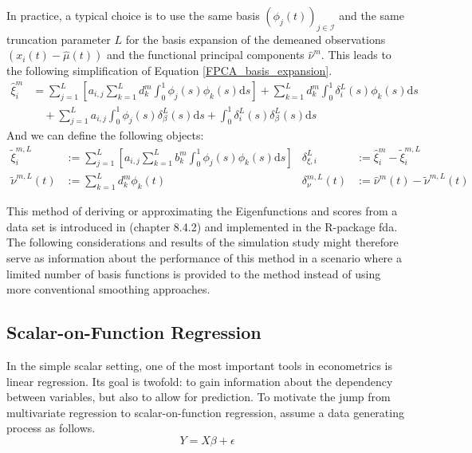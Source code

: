 \documentclass[11pt,twoside,a4paper]{article}
\begin{document}
	In practice, a typical choice is to use the same basis $\left(\phi_j(t)\right)_{j \in \mathcal{I}}$ and the same truncation parameter $L$ for the basis expansion of the demeaned observations $\left(x_i(t) - \hat{\mu}(t)\right)$ and the functional principal components $\hat{\nu}^m$. This leads to the following simplification of Equation \ref{FPCA_basis_expansion}.
	\begin{equation}\label{score_approx}
		\begin{split}
			\hat{\xi}_{i}^m &= \sum_{j = 1}^{L} \left[a_{i,j}\sum_{k = 1}^{L} d_{k}^m \int_{0}^{1} \phi_j(s) \phi_{k}(s)\mathrm{d}s \right] +  \sum_{k = 1}^{L} d_{k}^m \int_{0}^{1} \delta_i^L(s) \phi_{k}(s) \mathrm{d}s \\
			& \quad + \sum_{j = 1}^{L} a_{i,j} \int_{0}^{1}\phi_j(s) \delta_{\beta}^L(s) \mathrm{d}s + \int_{0}^{1} \delta_i^L(s) \delta_{\beta}^L(s) \mathrm{d}s
		\end{split}
	\end{equation}
	And we can define the following objects:
		\begin{align}
			\tilde{\xi}^{m,L}_{i} & := \sum_{j = 1}^{L} \left[a_{i,j}\sum_{k = 1}^{L} b_{k}^m \int_{0}^{1} \phi_j(s) \phi_{k}(s)\mathrm{d}s \right] 
			& \delta_{\xi, i}^L & := \hat{\xi}_{i}^m - \tilde{\xi}^{m,L}_{i} \\
			\tilde{\nu}^{m,L}(t) & := \sum_{k = 1}^{L} d_{k}^m \phi_{k}(t) 
			& \delta_{\nu}^{m, L}(t) & := \hat{\nu}^m(t) - \tilde{\nu}^{m,L}(t)
		\end{align}	
	
	This method of deriving or approximating the Eigenfunctions and scores from a data set is introduced in \cite{ramsay_functional_2005} (chapter 8.4.2) and implemented in the R-package fda. The following considerations and results of the simulation study might therefore serve as information about the performance of this method in a scenario where a limited number of basis functions is provided to the method instead of using more conventional smoothing approaches.
	
	\subsection{Scalar-on-Function Regression}\label{Scalar_on_function_regression}
	In the simple scalar setting, one of the most important tools in econometrics is linear regression. Its goal is twofold: to gain information about the dependency between variables, but also to allow for prediction. To motivate the jump from multivariate regression to scalar-on-function regression, assume a data generating process as follows.
	\begin{equation}
		Y = X\beta + \epsilon
	\end{equation}
	
\end{document}
